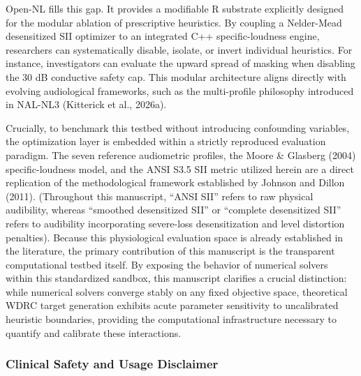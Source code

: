 \documentclass[
  12pt,
]{article}
\begin{document}
Open-NL fills this gap. It provides a modifiable R substrate explicitly
designed for the modular ablation of prescriptive heuristics. By
coupling a Nelder-Mead desensitized SII optimizer to an integrated C++
specific-loudness engine, researchers can systematically disable,
isolate, or invert individual heuristics. For instance, investigators
can evaluate the upward spread of masking when disabling the 30 dB
conductive safety cap. This modular architecture aligns directly with
evolving audiological frameworks, such as the multi-profile philosophy
introduced in NAL-NL3 (Kitterick et al., 2026a).

Crucially, to benchmark this testbed without introducing confounding
variables, the optimization layer is embedded within a strictly
reproduced evaluation paradigm. The seven reference audiometric
profiles, the Moore \& Glasberg (2004) specific-loudness model, and the
ANSI S3.5 SII metric utilized herein are a direct replication of the
methodological framework established by Johnson and Dillon (2011).
(Throughout this manuscript, ``ANSI SII'' refers to raw physical
audibility, whereas ``smoothed desensitized SII'' or ``complete
desensitized SII'' refers to audibility incorporating severe-loss
desensitization and level distortion penalties). Because this
physiological evaluation space is already established in the literature,
the primary contribution of this manuscript is the transparent
computational testbed itself. By exposing the behavior of numerical
solvers within this standardized sandbox, this manuscript clarifies a
crucial distinction: while numerical solvers converge stably on any
fixed objective space, theoretical WDRC target generation exhibits acute
parameter sensitivity to uncalibrated heuristic boundaries, providing
the computational infrastructure necessary to quantify and calibrate
these interactions.

\subsubsection{Clinical Safety and Usage
Disclaimer}\label{clinical-safety-and-usage-disclaimer}
\end{document}
